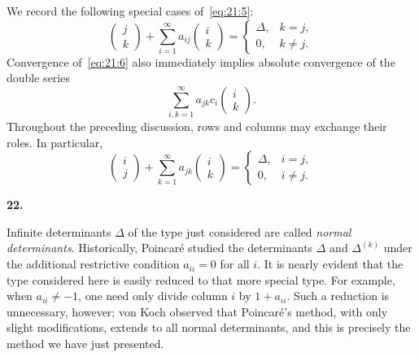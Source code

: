 \documentclass[
  paper=b5,
  fontsize=13pt,
  twoside=true,
  open=any,
  bookmarkpackage=false,
  chapterprefix=true,
  headings=normal
]{scrbook}
\theoremstyle{definition}
\newcommand{\numberedparagraph}[1]{%
  \par\medskip\phantomsection\label{sec:#1}%
  \noindent\textbf{#1.}\enspace
}
\begin{document}
We record the following special cases of~\eqref{eq:21:5}:
\begin{equation}
 \left(\begin{matrix}j\\k\end{matrix}\right)
 +\sum_{i=1}^{\infty}a_{ij}
 \left(\begin{matrix}i\\k\end{matrix}\right)
 =\begin{cases}\Delta,&k=j,\\0,&k\ne j.
 \end{cases}
 \tag{7}\label{eq:21:7}
\end{equation}
Convergence of~\eqref{eq:21:6} also immediately implies absolute convergence of the double series
\begin{equation}
 \sum_{i,k=1}^{\infty}a_{jk}c_i
 \left(\begin{matrix}i\\k\end{matrix}\right).
 \tag{8}\label{eq:21:8}
\end{equation}
Throughout the preceding discussion, rows and columns may exchange their roles. In particular,
\begin{equation}
 \left(\begin{matrix}i\\j\end{matrix}\right)
 +\sum_{k=1}^{\infty}a_{jk}
 \left(\begin{matrix}i\\k\end{matrix}\right)
 =\begin{cases}\Delta,&i=j,\\0,&i\ne j.
 \end{cases}
 \tag{9}\label{eq:21:9}
\end{equation}

\numberedparagraph{22}
Infinite determinants $\Delta$ of the type just considered are called \emph{normal determinants}. Historically, Poincar\'e studied the determinants $\Delta$ and $\Delta^{(k)}$ under the additional restrictive condition $a_{ii}=0$ for all $i$. It is nearly evident that the type considered here is easily reduced to that more special type. For example, when $a_{ii}\ne-1$, one need only divide column $i$ by $1+a_{ii}$. Such a reduction is unnecessary, however; von Koch observed that Poincar\'e's method,
with only slight modifications, extends to all normal determinants, and this is precisely the method we have just presented.
\end{document}
